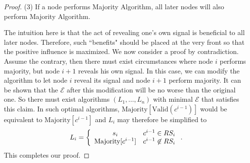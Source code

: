 \documentclass[a4paper,UKenglish]{lipics}
\theoremstyle{definition}
\begin{document}
\begin{proof}
(3) If a node performs Majority Algorithm, all later nodes will also perform Majority Algorithm.
 
The intuition here is that the act of revealing one's own signal is beneficial to all later nodes. 
Therefore, such ``benefits" should be placed at the very front so that the positive influence is maximized.
We now consider a proof by contradiction. 
Assume the contrary, then there must exist circumstances where node $i$ performs majority, but node $i + 1$ reveals his own signal. 
In this case, we can modify the algorithm to let node $i$ reveal its signal and node $i+1$ perform majority. 
It can be shown that the $\mathcal{E}$ after this modification will be no worse than the original one. 
So there must exist algorithms $(L_1, \dots, L_n)$ with minimal $\mathcal{E}$ that satisfies this claim.
In such optimal algorithms, $\text{Majority}[\text{Valid}(c^{i-1})]$ would be equivalent to $\text{Majority}[c^{i-1}]$
	and $L_i$ may therefore be simplified to
\begin{equation*}
L_i 
= \left\{ 
	\begin{array}{c l}
		s_i & c^{i-1} \in RS_i \\
 		\text{Majority}[c^{i-1}] & c^{i-1} \not\in RS_i
 	\end{array}
	\right..
\end{equation*}
This completes our proof.
\end{proof}
\end{document}
